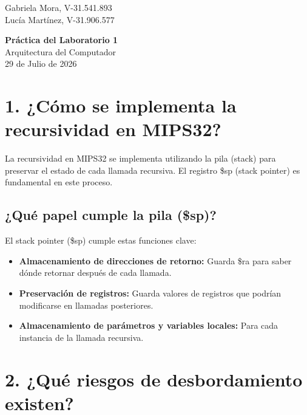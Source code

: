 \documentclass[12pt]{article}
\begin{document}
\begin{flushright}
Gabriela Mora, V-31.541.893 \\
Lucía Martínez, V-31.906.577 \\
\end{flushright}

\vspace{1cm}

\begin{center}
\LARGE\textbf{Práctica del Laboratorio 1} \\
\vspace{0.3cm}
\large Arquitectura del Computador \\
\vspace{0.3cm}
\normalsize 29 de Julio de 2026
\end{center}

\vspace{1cm}

\section*{1. ¿Cómo se implementa la recursividad en MIPS32?}

La recursividad en MIPS32 se implementa utilizando la pila (stack) para preservar el estado de cada llamada recursiva. El registro \$sp (stack pointer) es fundamental en este proceso.

\subsection*{¿Qué papel cumple la pila (\$sp)?}

El stack pointer (\$sp) cumple estas funciones clave:

\begin{itemize}
    \item \textbf{Almacenamiento de direcciones de retorno:} Guarda \$ra para saber dónde retornar después de cada llamada.
    \item \textbf{Preservación de registros:} Guarda valores de registros que podrían modificarse en llamadas posteriores.
    \item \textbf{Almacenamiento de parámetros y variables locales:} Para cada instancia de la llamada recursiva.
\end{itemize}

\section*{2. ¿Qué riesgos de desbordamiento existen?}
\end{document}

